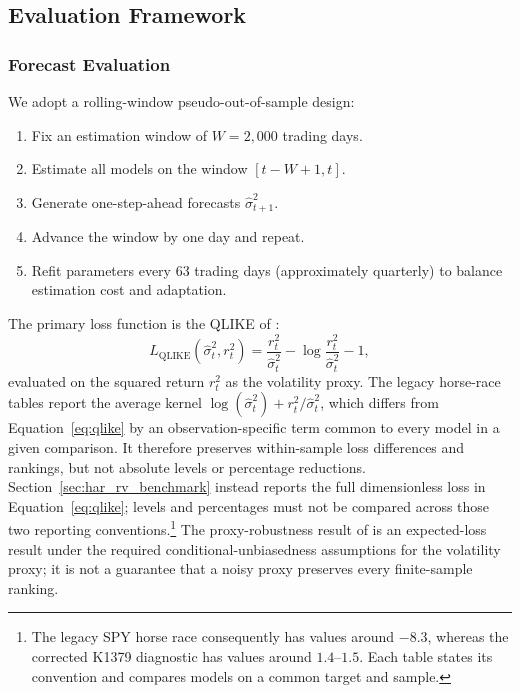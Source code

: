 \documentclass[12pt,a4paper]{article}
\begin{document}
\subsection{Evaluation Framework}
\label{sec:evaluation}

\subsubsection{Forecast Evaluation}

We adopt a rolling-window pseudo-out-of-sample design:
\begin{enumerate}
\item Fix an estimation window of $W = 2{,}000$ trading days.
\item Estimate all models on the window $[t-W+1, t]$.
\item Generate one-step-ahead forecasts $\hat{\sigma}_{t+1}^2$.
\item Advance the window by one day and repeat.
\item Refit parameters every 63 trading days (approximately quarterly) to balance estimation cost and adaptation.
\end{enumerate}

The primary loss function is the QLIKE of \citet{patton2011}:
\begin{equation}
L_{\text{QLIKE}}(\hat{\sigma}_t^2, r_t^2) = \frac{r_t^2}{\hat{\sigma}_t^2} - \log\frac{r_t^2}{\hat{\sigma}_t^2} - 1,
\label{eq:qlike}
\end{equation}
evaluated on the squared return $r_t^2$ as the volatility proxy. The legacy horse-race tables report the average kernel $\log(\hat{\sigma}_t^2) + r_t^2/\hat{\sigma}_t^2$, which differs from Equation~\ref{eq:qlike} by an observation-specific term common to every model in a given comparison. It therefore preserves within-sample loss differences and rankings, but not absolute levels or percentage reductions. Section~\ref{sec:har_rv_benchmark} instead reports the full dimensionless loss in Equation~\ref{eq:qlike}; levels and percentages must not be compared across those two reporting conventions.\footnote{The legacy SPY horse race consequently has values around $-8.3$, whereas the corrected K1379 diagnostic has values around $1.4$--$1.5$. Each table states its convention and compares models on a common target and sample.} The proxy-robustness result of \citet{patton2011} is an expected-loss result under the required conditional-unbiasedness assumptions for the volatility proxy; it is not a guarantee that a noisy proxy preserves every finite-sample ranking.
\end{document}
